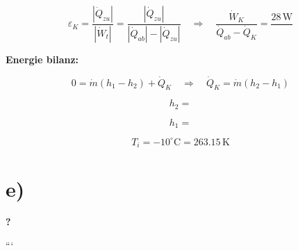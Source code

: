 \[
\varepsilon_K = \frac{|\dot{Q}_{zu}|}{|\dot{W}_t|} = \frac{|\dot{Q}_{zu}|}{|\dot{Q}_{ab}| - |\dot{Q}_{zu}|} \quad \Rightarrow \quad \frac{\dot{W}_K}{\dot{Q}_{ab} - \dot{Q}_K} = \frac{28 \, \text{W}}{}
\]

\textbf{Energie bilanz:}

\[
0 = \dot{m} (h_1 - h_2) + \dot{Q}_K \quad \Rightarrow \quad \dot{Q}_K = \dot{m} (h_2 - h_1)
\]

\[
h_2 = 
\]

\[
h_1 = 
\]

\[
T_i = -10^\circ \text{C} = 263.15 \, \text{K}
\]

\section*{e)}

\textbf{?}

```